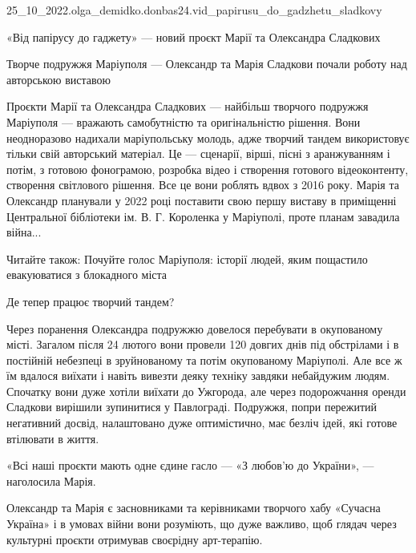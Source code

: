  
 
 
 
 

25_10_2022.olga_demidko.donbas24.vid_papirusu_do_gadzhetu_sladkovy

«Від папірусу до гаджету» — новий проєкт Марії та Олександра Сладкових

Творче подружжя Маріуполя — Олександр та Марія Сладкови почали роботу над авторською виставою

Проєкти Марії та Олександра Сладкових — найбільш творчого подружжя Маріуполя —
вражають самобутністю та оригінальністю рішення. Вони неодноразово надихали
маріупольську молодь, адже творчий тандем використовує тільки свій авторський
матеріал. Це — сценарії, вірші, пісні з аранжуванням і потім, з готовою
фонограмою, розробка відео і створення готового відеоконтенту, створення
світлового рішення. Все це вони роблять вдвох з 2016 року. Марія та Олександр
планували у 2022 році поставити свою першу виставу в приміщенні Центральної
бібліотеки ім. В. Г. Короленка у Маріуполі, проте планам завадила війна...

Читайте також: Почуйте голос Маріуполя: історії людей, яким пощастило
евакуюватися з блокадного міста

Де тепер працює творчий тандем?

Через поранення Олександра подружжю довелося перебувати в окупованому місті.
Загалом після 24 лютого вони провели 120 довгих днів під обстрілами і в
постійній небезпеці в зруйнованому та потім окупованому Маріуполі. Але все ж їм
вдалося виїхати і навіть вивезти деяку техніку завдяки небайдужим людям.
Спочатку вони дуже хотіли виїхати до Ужгорода, але через подорожчання оренди
Сладкови вирішили зупинитися у Павлограді. Подружжя, попри пережитий негативний
досвід, налаштовано дуже оптимістично, має безліч ідей, які готове втілювати в
життя. 

«Всі наші проєкти мають одне єдине гасло —  «З любов'ю до України», —
наголосила Марія.

Олександр та Марія є засновниками та керівниками творчого хабу «Сучасна
Україна» і в умовах війни вони розуміють, що дуже важливо, щоб глядач через
культурні проєкти отримував своєрідну арт-терапію.

